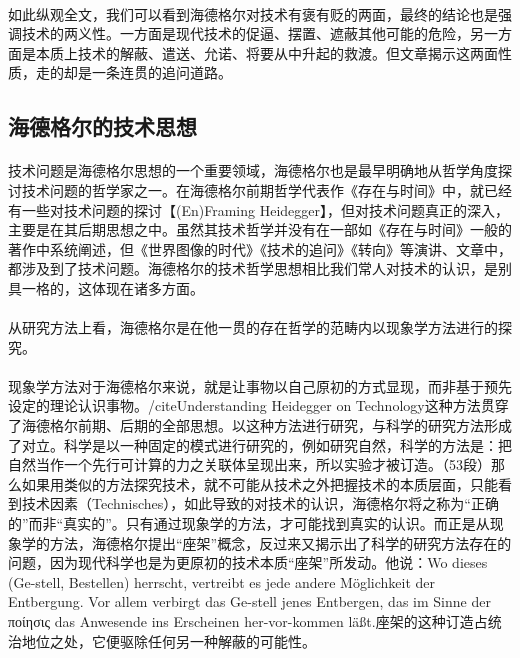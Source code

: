 \documentclass{article}
\begin{document}
		\paragraph{}
		如此纵观全文，我们可以看到海德格尔对技术有褒有贬的两面，最终的结论也是强调技术的两义性。一方面是现代技术的促逼、摆置、遮蔽其他可能的危险，另一方面是本质上技术的解蔽、遣送、允诺、将要从中升起的救渡。但文章揭示这两面性质，走的却是一条连贯的追问道路。

	\subsection{海德格尔的技术思想}
		\paragraph{}
		技术问题是海德格尔思想的一个重要领域，海德格尔也是最早明确地从哲学角度探讨技术问题的哲学家之一。在海德格尔前期哲学代表作《存在与时间》中，就已经有一些对技术问题的探讨【(En)Framing Heidegger】，但对技术问题真正的深入，主要是在其后期思想之中。虽然其技术哲学并没有在一部如《存在与时间》一般的著作中系统阐述，但《世界图像的时代》《技术的追问》《转向》等演讲、文章中，都涉及到了技术问题。海德格尔的技术哲学思想相比我们常人对技术的认识，是别具一格的，这体现在诸多方面。
		\paragraph{}
		从研究方法上看，海德格尔是在他一贯的存在哲学的范畴内以现象学方法进行的探究。
		\paragraph{}
		现象学方法对于海德格尔来说，就是让事物以自己原初的方式显现，而非基于预先设定的理论认识事物。/cite{Understanding Heidegger on Technology}这种方法贯穿了海德格尔前期、后期的全部思想。以这种方法进行研究，与科学的研究方法形成了对立。科学是以一种固定的模式进行研究的，例如研究自然，科学的方法是：把自然当作一个先行可计算的力之关联体呈现出来，所以实验才被订造。（53段）那么如果用类似的方法探究技术，就不可能从技术之外把握技术的本质层面，只能看到技术因素（Technisches），如此导致的对技术的认识，海德格尔将之称为“正确的”而非“真实的”。只有通过现象学的方法，才可能找到真实的认识。而正是从现象学的方法，海德格尔提出“座架”概念，反过来又揭示出了科学的研究方法存在的问题，因为现代科学也是为更原初的技术本质“座架”所发动。他说：Wo dieses (Ge-stell, Bestellen) herrscht, vertreibt es jede andere Möglichkeit der Entbergung. Vor allem verbirgt das Ge-stell jenes Entbergen, das im Sinne der ποίησις das Anwesende ins Erscheinen her-vor-kommen läßt.座架的这种订造占统治地位之处，它便驱除任何另一种解蔽的可能性。
\end{document}
